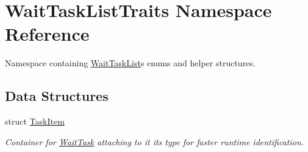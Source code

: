 \hypertarget{namespace_wait_task_list_traits}{}\section{Wait\+Task\+List\+Traits Namespace Reference}
\label{namespace_wait_task_list_traits}


Namespace containing \hyperlink{class_wait_task_list}{Wait\+Task\+List}\textquotesingle{}s enums and helper structures.  


\subsection*{Data Structures}
\begin{DoxyCompactItemize}
\item 
struct \hyperlink{struct_wait_task_list_traits_1_1_task_item}{Task\+Item}
\begin{DoxyCompactList}\small\item\em Container for \hyperlink{class_wait_task}{Wait\+Task} attaching to it its type for faster runtime identification. \end{DoxyCompactList}\end{DoxyCompactItemize}
